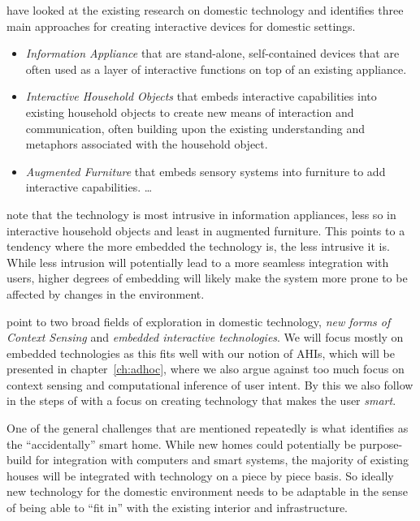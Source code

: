 
\citet{rodden2003evolution} have looked at the existing research on domestic technology and identifies three main approaches for creating interactive devices for domestic settings.

\begin{itemize}
  \item{\emph{Information Appliance} that are stand-alone, self-contained devices that are often used as a layer of interactive functions on top of an existing appliance.}
  \item{\emph{Interactive Household Objects} that embeds interactive capabilities into existing household objects to create new means of interaction and communication, often building upon the existing understanding and metaphors associated with the household object.}
  \item{\emph{Augmented Furniture} that embeds sensory systems into furniture to add interactive capabilities. \ldots}
\end{itemize}

\citet{rodden2003evolution} note that the technology is most intrusive in information appliances, less so in interactive household objects and least in augmented furniture.
This points to a tendency where the more embedded the technology is, the less intrusive it is.
While less intrusion will potentially lead to a more seamless integration with users, higher degrees of embedding will likely make the system more prone to be affected by changes in the environment. 

\citeauthor{rodden2003evolution} point to two broad fields of exploration in domestic technology, \emph{new forms of Context Sensing} and \emph{embedded interactive technologies}.
We will focus mostly on embedded technologies as this fits well with our notion of AHIs, which will be presented in chapter~\ref{ch:adhoc}, where we also argue against too much focus on context sensing and computational inference of user intent.
By this we also follow in the steps of \citet{taylor2007homes} with a focus on creating technology that makes the user \emph{smart}.

One of the general challenges that are mentioned repeatedly \citep{edwards2001home,aldrich2003smart,rodden2003evolution,brand1995buildings} is what \citet{edwards2001home} identifies as the ``accidentally'' smart home.
While new homes could potentially be purpose-build for integration with computers and smart systems, the majority of existing houses will be integrated with technology on a piece by piece basis.
So ideally new technology for the domestic environment needs to be adaptable in the sense of being able to ``fit in'' with the existing interior and infrastructure. 

